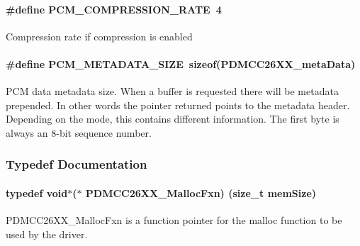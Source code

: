 \paragraph[{P\+C\+M\+\_\+\+C\+O\+M\+P\+R\+E\+S\+S\+I\+O\+N\+\_\+\+R\+A\+T\+E}]{\setlength{\rightskip}{0pt plus 5cm}\#define P\+C\+M\+\_\+\+C\+O\+M\+P\+R\+E\+S\+S\+I\+O\+N\+\_\+\+R\+A\+T\+E~4}\label{_p_d_m_c_c26_x_x_8h_a98722a106401368b0df3e68c19c7edd3}
Compression rate if compression is enabled 
\paragraph[{P\+C\+M\+\_\+\+M\+E\+T\+A\+D\+A\+T\+A\+\_\+\+S\+I\+Z\+E}]{\setlength{\rightskip}{0pt plus 5cm}\#define P\+C\+M\+\_\+\+M\+E\+T\+A\+D\+A\+T\+A\+\_\+\+S\+I\+Z\+E~sizeof({\bf P\+D\+M\+C\+C26\+X\+X\+\_\+meta\+Data})}\label{_p_d_m_c_c26_x_x_8h_ae553576c451c4277d4496b5fe7f26e24}
P\+C\+M data metadata size. When a buffer is requested there will be metadata prepended. In other words the pointer returned points to the metadata header. Depending on the mode, this contains different information. The first byte is always an 8-\/bit sequence number. 

\subsubsection{Typedef Documentation}
\paragraph[{P\+D\+M\+C\+C26\+X\+X\+\_\+\+Malloc\+Fxn}]{\setlength{\rightskip}{0pt plus 5cm}typedef void$\ast$($\ast$ P\+D\+M\+C\+C26\+X\+X\+\_\+\+Malloc\+Fxn) (size\+\_\+t mem\+Size)}\label{_p_d_m_c_c26_x_x_8h_acce02978ce536ea3b98a673587a6e75c}


P\+D\+M\+C\+C26\+X\+X\+\_\+\+Malloc\+Fxn is a function pointer for the malloc function to be used by the driver. 

